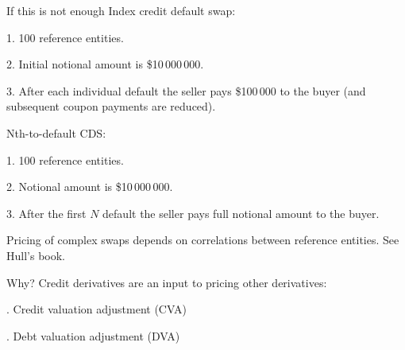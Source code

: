 \documentclass{beamer}
\begin{document}
\begin{frame}{If this is not enough}
\justify
Index credit default swap:

1. 100 reference entities.

2. Initial notional amount is \$10\,000\,000.

3. After each individual default the seller pays \$100\,000 to the buyer (and subsequent coupon payments are reduced).

\justify
Nth-to-default CDS:

1. 100 reference entities.

2. Notional amount is \$10\,000\,000.

3. After the first $N$ default the seller pays full notional amount to the buyer.

\justify
Pricing of complex swaps depends on correlations between reference entities. See Hull's book.
\end{frame}



\begin{frame}{Why?}
\justify
Credit derivatives are an input to pricing other derivatives:

. Credit valuation adjustment (CVA)

. Debt valuation adjustment (DVA)
\end{frame}
\end{document}
